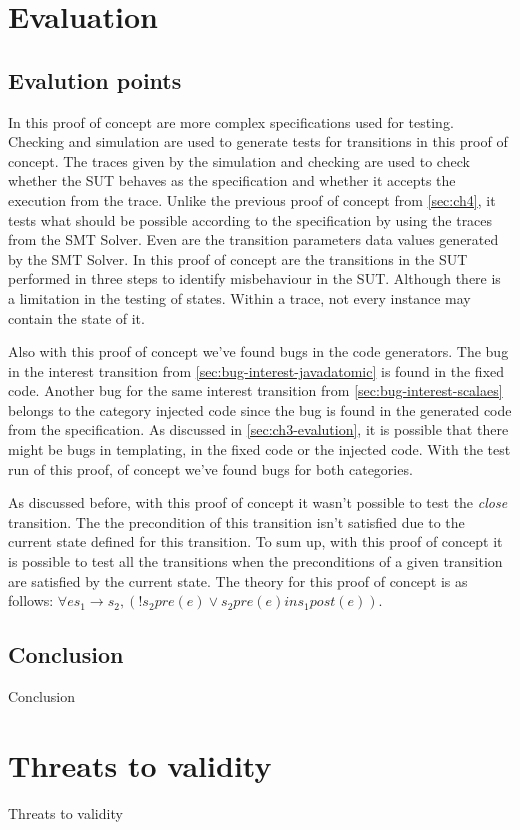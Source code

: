 
\section{Evaluation}
\label{sec:ch5-evaluation}

\subsection{Evalution points}
In this proof of concept are more complex specifications used for testing.
Checking and simulation are used to generate tests for transitions in this proof
of concept. The traces given by the simulation and checking are used to check
whether the SUT behaves as the specification and whether it accepts the
execution from the trace. Unlike the previous proof of concept from
\autoref{sec:ch4}, it tests what should be possible according to the
specification by using the traces from the SMT Solver. Even are the transition
parameters data values generated by the SMT Solver. In this proof of concept are
the transitions in the SUT performed in three steps to identify misbehaviour in
the SUT. Although there is a limitation in the testing of states. Within a
trace, not every instance may contain the state of it.

Also with this proof of concept we've found bugs in the code generators. The bug
in the interest transition from \autoref{sec:bug-interest-javadatomic} is found
in the fixed code. Another bug for the same interest transition from
\autoref{sec:bug-interest-scalaes} belongs to the category injected code since
the bug is found in the generated code from the specification. As discussed in
\autoref{sec:ch3-evalution}, it is possible that there might be bugs in
templating, in the fixed code or the injected code. With the test run of this
proof, of concept we've found bugs for both categories.

As discussed before, with this proof of concept it wasn't possible to test the
\textit{close} transition. The the precondition of this transition isn't
satisfied due to the current state defined for this transition. To sum up, with
this proof of concept it is possible to test all the transitions when the
preconditions of a given transition are satisfied by the current state. The
theory for this proof of concept is as follows:
$\forall e s_{1} \to s_{2}, (! s_{2} pre(e) \lor s_{2} pre(e) in s_{1} post(e))$.


\subsection{Conclusion}
Conclusion

\section{Threats to validity}
Threats to validity
